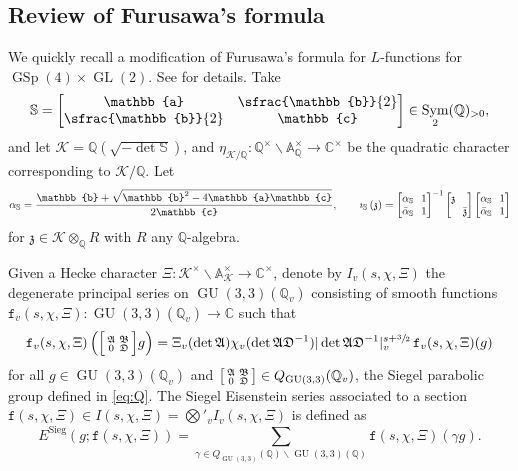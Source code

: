\documentclass[JEP,XML,SOM,Unicode,published]{cedram}
\newenvironment{smallbmatrix}{\big[\begin{smallmatrix}}{\end{smallmatrix}\big]}
\newenvironment{Smallbmatrix}{\Big[\begin{smallmatrix}}{\end{smallmatrix}\Big]}
\newcommand{\Lfunctions}{$L$\nobreakdash-func\-tions\xspace}
\theoremstyle{plain}
\theoremstyle{remark}
\let\mr\mathrm
\newcommand{\bA}{\mathbb{A}}
\newcommand{\bC}{\mathbb{C}}
\newcommand{\bQ}{\mathbb{Q}}
\newcommand{\bS}{\mathbb{S}}
\newcommand{\bba}{\mathbb{a}}
\newcommand{\bbb}{\mathbb{b}}
\newcommand{\bbc}{\mathbb{c}}
\newcommand{\cK}{\mathcal{K}}
\newcommand{\fz}{\mathfrak{z}}
\newcommand{\fA}{\mathfrak{A}}
\newcommand{\fB}{\mathfrak{B}}
\newcommand{\fD}{\mathfrak{D}}
\DeclareMathOperator{\GL}{GL}
\DeclareMathOperator{\GSp}{GSp}
\DeclareMathOperator{\GU}{GU}
\newcommand{\Sieg}{\mr{Sieg}}
\DeclareMathOperator{\Sym}{Sym}
\newcommand{\dsec}{{\texttt f}}
\newcommand{\alphaS}{\alpha_{\mathbb{S}}}
\newcommand{\alphabS}{\bar{\alpha}_{\mathbb{S}}}
\begin{document}
\subsection{Review of Furusawa's formula}\label{sec:Furusawa}
We quickly recall a modification of Furusawa's formula for \Lfunctions for $\GSp(4)\times\GL(2)$. See \cite[\S2.1]{pFL} for details. Take
\begin{align*}
\bS=\begin{bmatrix}\bba&\sfrac{\bbb}{2}\\\sfrac{\bbb}{2}&\bbc\end{bmatrix}\in\Sym_2(\bQ)_{>0},
\end{align*}
and let $\cK=\bQ(\sqrt{-\det \bS})$, and $\eta_{\cK/\bQ}:\bQ^\times\backslash\bA^\times_\bQ\to\bC^\times$ be the quadratic character corresponding to $\cK/\bQ$. Let
\begin{align*}
\alphaS=\frac{\bbb+\sqrt{\bbb^2-4\bba\bbc}}{2\bbc},\arraycolsep3.5pt
\qquad\imath_\bS\left(\fz\right)
=\begin{bmatrix}\alphaS&1\\ \alphabS&1\end{bmatrix}^{-1} \begin{bmatrix}\fz\\&\bar{\fz}\end{bmatrix}\begin{bmatrix}\alphaS&1\\ \alphabS&1\end{bmatrix}
\end{align*}
for $\fz\in \cK\otimes_\bQ R$ with $R$ any $\bQ$-algebra.

Given a Hecke character $\Xi:\cK^\times\backslash\bA^\times_\cK\to\bC^\times$, denote by $I_v(s,\chi,\Xi)$ the degenerate principal series on $\GU(3,3)(\bQ_v)$ consisting of smooth functions $\dsec_v(s,\chi,\Xi):\GU(3,3)(\bQ_v)\to\bC$ such that
\begin{align*}
\dsec_v(s,\chi,\Xi)\left(\begin{Smallbmatrix}\fA&\fB\\0&\fD\end{Smallbmatrix}g\right)=\Xi_v(\det \fA)\chi_v(\det \fA\fD^{-1})|\det \fA\fD^{-1}|^{s+\sfrac{3}{2}}_v\,\dsec_v(s,\chi,\Xi)(g)
\end{align*}
for all $g\in\GU(3,3)(\bQ_v)$ and $\begin{smallbmatrix}\fA&\fB\\0&\fD\end{smallbmatrix}\in Q_{\GU(3,3)}(\bQ_v)$, the Siegel parabolic group defined in \eqref{eq:Q}. The Siegel Eisenstein series associated to a section $\dsec(s,\chi,\Xi)\in I(s,\chi,\Xi)=\bigotimes'_v I_v(s,\chi,\Xi)$ is defined as
\[
E^{\Sieg}(g;\dsec(s,\chi,\Xi))=\sum_{\gamma\in Q_{\GU(3,3)}(\bQ)\backslash \GU(3,3)(\bQ)}\dsec(s,\chi,\Xi)(\gamma g).
\]
\end{document}
